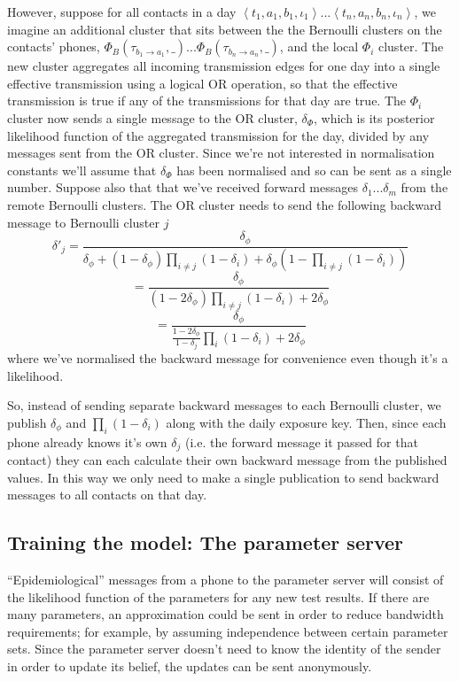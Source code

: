 \documentclass{article}
\begin{document}
However, suppose for all contacts in a day $\left<t_1,a_1,b_1,\iota_1\right>...\left<t_n,a_n,b_n,\iota_n\right>$, we imagine an additional cluster that sits between the the Bernoulli clusters on the contacts' phones, $ \Phi_B(\tau_{b_1\rightarrow a_1},\_) ... \Phi_B(\tau_{b_n\rightarrow a_n},\_)$, and the local $\Phi_i$ cluster. The new cluster aggregates all incoming transmission edges for one day into a single effective transmission using a logical OR operation, so that the effective transmission is true if any of the transmissions for that day are true. The $\Phi_i$ cluster now sends a single message to the OR cluster, $\delta_\Phi$, which is its posterior likelihood function of the aggregated transmission for the day, divided by any messages sent from the OR cluster. Since we're not interested in normalisation constants we'll assume that $\delta_\Phi$ has been normalised and so can be sent as a single number. Suppose also that that we've received forward messages $\delta_1...\delta_m$ from the remote Bernoulli clusters. The OR cluster needs to send the following backward message to Bernoulli cluster $j$
\[
\delta'_j = \frac{\delta_\phi}{\delta_\phi + (1-\delta_\phi)\prod_{i\ne j}(1-\delta_i) + \delta_\phi(1 - \prod_{i\ne j}(1-\delta_i))}
\]
\[
= \frac{\delta_\phi}{ (1-2\delta_\phi)\prod_{i\ne j}(1-\delta_i) + 2\delta_\phi}
\]
\[
= \frac{\delta_\phi}{ \frac{1-2\delta_\phi}{1-\delta_j}\prod_{i}(1-\delta_i) + 2\delta_\phi}
\]
where we've normalised the backward message for convenience even though it's a likelihood.

So, instead of sending separate backward messages to each Bernoulli cluster, we publish $\delta_\phi$ and $\prod_i (1-\delta_i)$ along with the daily exposure key. Then, since each phone already knows it's own $\delta_j$ (i.e. the forward message it passed for that contact) they can each calculate their own backward message from the published values. In this way we only need to make a single publication to send backward messages to all contacts on that day.

\subsection{Training the model: The parameter server}

``Epidemiological'' messages from a phone to the parameter server will consist of the likelihood function of the parameters for any new test results. If there are many parameters, an approximation could be sent in order to reduce bandwidth requirements; for example, by assuming independence between certain parameter sets. Since the parameter server doesn't need to know the identity of the sender in order to update its belief, the updates can be sent anonymously.
\end{document}
